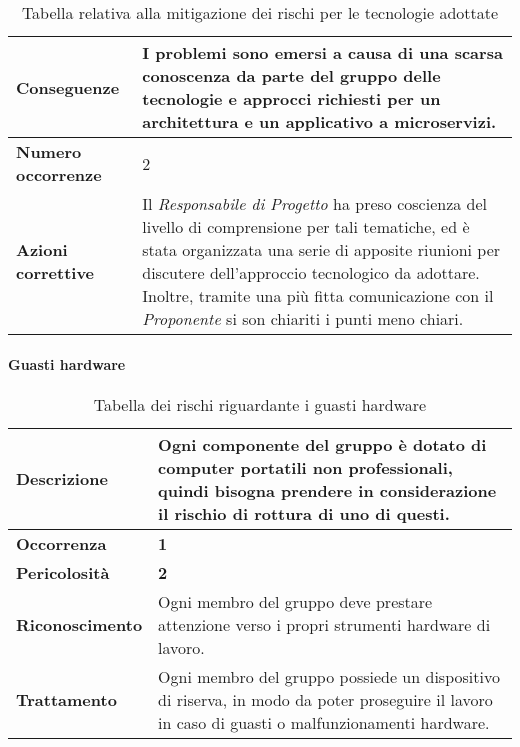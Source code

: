 \begin{table}[H]
	\begin{center}
		\begin{tabular}{|l | p{11cm}|}
			\hline
			\textbf{Conseguenze}	& I problemi sono emersi a causa di una scarsa conoscenza da parte del gruppo delle tecnologie e approcci richiesti per un architettura e un applicativo a microservizi. \\
			\hline
			\textbf{Numero occorrenze} & 2 \\
			\hline
			\textbf{Azioni correttive}	&	Il \textit{Responsabile di Progetto} ha preso coscienza del livello di comprensione per tali tematiche, ed è stata organizzata una serie di apposite riunioni per discutere dell'approccio tecnologico da adottare. Inoltre, tramite una più fitta comunicazione con il
			\textit{Proponente} si son chiariti i punti meno chiari.	\\
			\hline
		\end{tabular}
		\caption{Tabella relativa alla mitigazione dei rischi per le tecnologie adottate}
	\end{center}
\end{table}

\paragraph{Guasti hardware}

\begin{table}[H]
	\begin{center}
		\begin{tabular}{|l | p{11cm}|}
			\hline
			\textbf{Descrizione}	& Ogni componente del gruppo è dotato di computer portatili non professionali, quindi bisogna prendere in considerazione il rischio di rottura di uno di questi. \\
			\hline
			\textbf{Occorrenza}	&	\textbf{1}	\\
			\hline
			\textbf{Pericolosità}	&	\textbf{2}	\\
			\hline
			\textbf{Riconoscimento}	&	Ogni membro del gruppo deve prestare attenzione verso i propri strumenti hardware di lavoro.	\\
			\hline
			\textbf{Trattamento}	&	Ogni membro del gruppo possiede un dispositivo di riserva, in modo da poter proseguire il lavoro in caso di guasti o malfunzionamenti hardware.	\\
			\hline
		\end{tabular}
		\caption{Tabella dei rischi riguardante i guasti hardware}
	\end{center}
\end{table}


